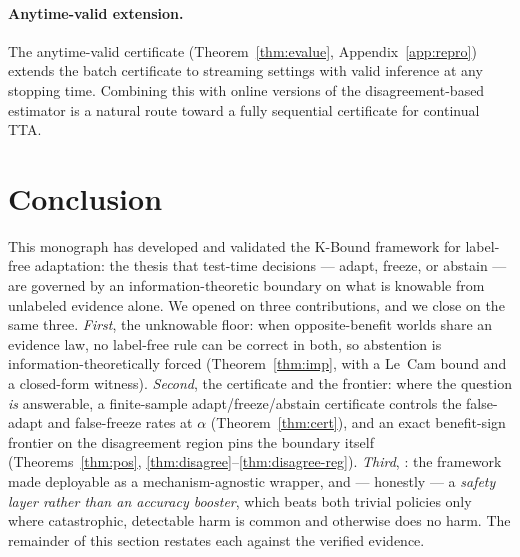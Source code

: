 \paragraph{Anytime-valid extension.}
The anytime-valid certificate (Theorem~\ref{thm:evalue}, Appendix~\ref{app:repro})
extends the batch certificate to streaming settings with valid inference at any
stopping time.  Combining this with online versions of the disagreement-based
estimator is a natural route toward a fully sequential certificate for continual TTA.

\section{Conclusion}\label{sec:disc-conclusion}

This monograph has developed and validated the K-Bound framework for label-free
adaptation: the thesis that test-time decisions --- adapt, freeze, or abstain ---
are governed by an information-theoretic boundary on what is knowable from
unlabeled evidence alone.  We opened on three contributions, and we close on the
same three.  \emph{First}, the unknowable floor: when opposite-benefit worlds
share an evidence law, no label-free rule can be correct in both, so abstention
is information-theoretically forced (Theorem~\ref{thm:imp}, with a Le~Cam bound
and a closed-form witness).  \emph{Second}, the certificate and the frontier:
where the question \emph{is} answerable, a finite-sample adapt/freeze/abstain
certificate controls the false-adapt and false-freeze rates at $\alpha$
(Theorem~\ref{thm:cert}), and an exact benefit-sign frontier on the disagreement
region pins the boundary itself (Theorems~\ref{thm:pos},
\ref{thm:disagree}--\ref{thm:disagree-reg}).  \emph{Third}, \KGA: the framework
made deployable as a mechanism-agnostic wrapper, and --- honestly --- a
\emph{safety layer rather than an accuracy booster}, which beats both trivial
policies only where catastrophic, detectable harm is common and otherwise does
no harm.  The remainder of this section restates each against the verified
evidence.

